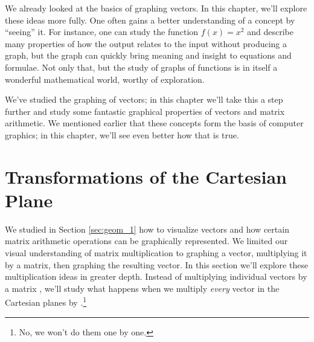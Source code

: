 We already looked at the basics of graphing vectors. In this chapter, we'll explore these ideas more fully. One often gains a better understanding of a concept by ``seeing'' it. For instance, one can study the function $f(x)=x^2$ and describe many properties of how the output relates to the input without producing a graph, but the graph can quickly bring meaning and insight to equations and formulae. Not only that, but the study of graphs of functions is in itself a wonderful mathematical world, worthy of exploration.

We've studied the graphing of vectors; in this chapter we'll take this a step further and study some fantastic graphical properties of vectors and matrix arithmetic. We mentioned earlier that these concepts form the basis of computer graphics; in this chapter, we'll see even better how that is true.

\section{Transformations of the Cartesian Plane}\label{sec:geom_3}


We studied in Section \ref{sec:geom_1} how to visualize vectors and how certain matrix arithmetic operations can be graphically represented. We limited our visual understanding of matrix  multiplication to graphing a vector, multiplying it by a matrix, then graphing the resulting vector. In this section we'll explore these multiplication ideas in greater depth. Instead of multiplying individual vectors by a matrix \tta, we'll study what happens when we multiply \textit{every} vector in the Cartesian planes by \tta.\footnote{No, we won't do them one by one.} \\

